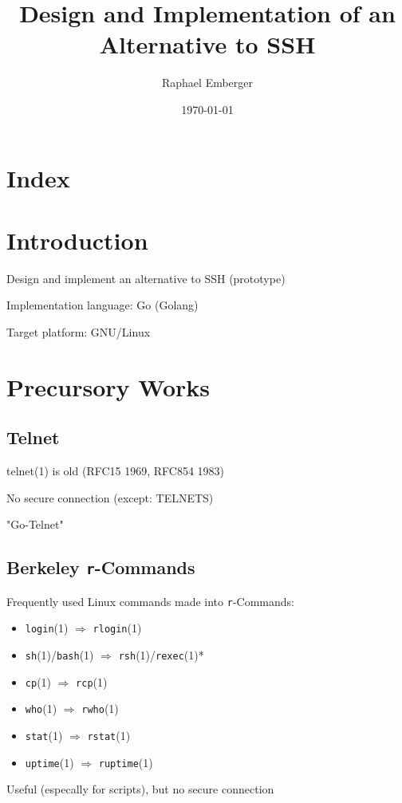 \documentclass[
	xcolor=dvipsnames,
	handout
]{beamer}
\title{Design and Implementation of an Alternative to SSH}
\date{\today}
\author{Raphael Emberger}
\newenvironment{zhawframe}[1][]
{\begin{frame}[environment=fr,#1]{\insertsubsectionhead}{\insertsectionhead}}
{\end{frame}
}
\begin{document}
\maketitle

\section*{Index}
\begin{zhawframe}[shrink]
\begin{multicols}{2}
\tableofcontents
\end{multicols}
\end{zhawframe}

\section{Introduction}
\begin{zhawframe}
 Design and implement an alternative to SSH (prototype)

 Implementation language: Go (Golang)

 Target platform: GNU/Linux
\end{zhawframe}

\section{Precursory Works}
\subsection{Telnet}
\begin{zhawframe}
 telnet(1) is old (RFC15 1969, RFC854 1983)

 No secure connection (except: TELNETS)

 "Go-Telnet"
\end{zhawframe}

\subsection{Berkeley \texttt{r}-Commands}
\begin{zhawframe}
Frequently used Linux commands made into \texttt{r}-Commands:
\begin{itemize}
\item \texttt{login}(1) $\Rightarrow$ \texttt{rlogin}(1)
\item \texttt{sh}(1)/\texttt{bash}(1) $\Rightarrow$ \texttt{rsh}(1)/\texttt{rexec}(1)*
\item \texttt{cp}(1) $\Rightarrow$ \texttt{rcp}(1)
\item \texttt{who}(1) $\Rightarrow$ \texttt{rwho}(1)
\item \texttt{stat}(1) $\Rightarrow$ \texttt{rstat}(1)
\item \texttt{uptime}(1) $\Rightarrow$ \texttt{ruptime}(1)
\end{itemize}
Useful (especally for scripts), but no secure connection
\end{zhawframe}
\end{document}
